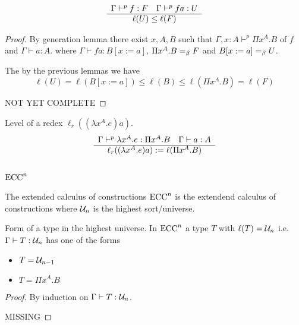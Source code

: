 \begin{lemma}
  $$
  \begin{array}{c} \Gamma \vdash^p f : F
    \quad
    \Gamma \vdash^p f a : U
   \\ \hline \ell(U) \le \ell(F)\end{array}
  $$
  \begin{proof}
    By generation lemma there exist $x,A,B$ such that
    $\Gamma,x:A \vdash^p \Pi x^A.B$ of $f$
    and
    $\Gamma \vdash a:A$.  where $\Gamma \vdash f a : B[x:=a]$,
    $\Pi x^A.B =_\beta F$ and $B[x:=a] =_\beta U$.

    The by the previous lemmas we have
    $$
    \ell(U) = \ell(B[x:=a]) \le \ell(B) \le \ell(\Pi x^A.B) = \ell(F)
    $$

    NOT YET COMPLETE
  \end{proof}
\end{lemma}


\begin{definition}
  Level of a redex $\ell_r((\lambda x^A.e) a)$.
  $$
  \begin{array}{c} \Gamma \vdash^p \lambda x^A.e : \Pi x^A.B
    \quad
    \Gamma \vdash a: A
     \\ \hline \ell_r((\lambda x^A.e) a) := \ell(\Pi x^A.B)\end{array}
  $$
\end{definition}



\subsection{$\text{ECC}^n$}

\begin{definition}
The extended calculus of constructions $\text{ECC}^n$ is the extendend calculus of
constructions where ${\cal U}_n$ is the highest sort/universe.
\end{definition}

\begin{lemma}
  Form of a type in the highest universe.
  In $\text{ECC}^n$ a type $T$ with $\ell(T) = {\cal U}_n$ i.e. $\Gamma \vdash T :
  {\cal U}_n$ has one of the forms
  \begin{itemize}
  \item $T = {\cal U}_{n-1}$

  \item $T = \Pi x^A.B$
  \end{itemize}
  \begin{proof}
    By induction on $\Gamma \vdash T: {\cal U}_n$.

    MISSING
  \end{proof}
\end{lemma}



